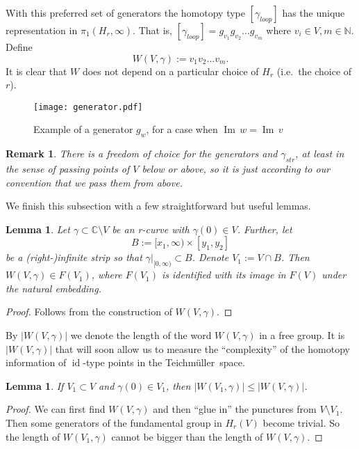 \documentclass[10pt,reqno,a4paper]{amsart}
\numberwithin{figure}{section}
\numberwithin{equation}{section}
\newtheorem{lmm}[thm]{Lemma}
\newtheorem{remark}[thm]{Remark}
\newcommand{\tei}{Teichm\"uller}
\newcommand{\id}{\operatorname{id}}
\renewcommand{\Im}{\operatorname{Im\,}}
\newcommand{\abs}[1]{\lvert #1 \rvert}
\begin{document}
With this preferred set of generators the homotopy type $[\gamma_{loop}]$ has the unique representation in $\pi_1(H_r,\infty)$. That is, $[\gamma_{loop}]=g_{v_1}g_{v_2}\dots g_{v_m}$ where $v_i \in V, m\in \mathbb{N}$. Define $$W(V, \gamma):=v_1 v_2\dots v_m. $$ It is clear that $W$ does not depend on a particular choice of $H_r$ (i.e.\ the choice of $r$). 

\begin{figure}[h]
	\texttt{[image: generator.pdf]}
	\caption{Example of a generator $g_w$, for a case when $\Im w=\Im v$}
	\label{pic:generator}
\end{figure}

\begin{remark}
	\label{rmrk:choice_of_generators}
	There is a freedom of choice for the generators and $\gamma_{str}$, at least in the sense of passing points of $V$ below or above, so it is just according to our convention that we pass them from above.	
\end{remark}

We finish this subsection with a few straightforward but useful lemmas.

\begin{lmm}
	\label{lmm:homotopy_in_rectangle}
	Let $\gamma\subset \mathbb{C}\setminus V$ be an r-curve with $\gamma(0)\in V$. Further, let
	$$B:=[x_1,\infty)\times[y_1,y_2]$$
	be a (right-)infinite strip so that $\gamma|_{[0,\infty)}\subset B$. Denote $V_1:=V\cap B$. Then $W(V,\gamma)\in F(V_1)$, where $F(V_1)$ is identified with its image in $F(V)$ under the natural embedding.	
\end{lmm}
\begin{proof}
	Follows from the construction of $W(V,\gamma)$.	
\end{proof}

By $\abs{W(V,\gamma)}$ we denote the length of the word $W(V,\gamma)$ in a free group. It is $\abs{W(V,\gamma)}$ that will soon allow us to measure the ``complexity'' of the homotopy information of $\id$-type points in the \tei\ space.

\begin{lmm}
	If $V_1\subset V$ and $\gamma(0)\in V_1$, then $\abs{W(V_1,\gamma)}\leq\abs{W(V,\gamma)}$.
\end{lmm}
\begin{proof}
	We can first find $W(V,\gamma)$ and then ``glue in'' the punctures from $V\setminus V_1$. Then some generators of the fundamental group in $H_r(V)$ become trivial. So the length of $W(V_1,\gamma)$ cannot be bigger than the length of $W(V,\gamma)$. 	
\end{proof}	
\end{document}
